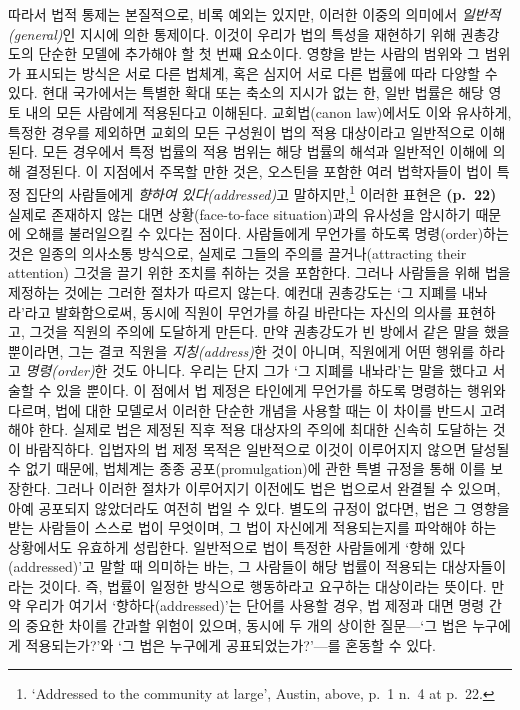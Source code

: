 \documentclass[12pt, oneside]{book}  %
\begin{document}
따라서 법적 통제는 본질적으로, 비록 예외는 있지만, 이러한 이중의
의미에서 \emph{일반적(general)}인 지시에 의한 통제이다. 이것이 우리가
법의 특성을 재현하기 위해 권총강도의 단순한 모델에 추가해야 할 첫 번째
요소이다. 영향을 받는 사람의 범위와 그 범위가 표시되는 방식은 서로 다른
법체계, 혹은 심지어 서로 다른 법률에 따라 다양할 수 있다. 현대
국가에서는 특별한 확대 또는 축소의 지시가 없는 한, 일반 법률은 해당 영토
내의 모든 사람에게 적용된다고 이해된다. 교회법(canon law)에서도 이와
유사하게, 특정한 경우를 제외하면 교회의 모든 구성원이 법의 적용
대상이라고 일반적으로 이해된다. 모든 경우에서 특정 법률의 적용 범위는
해당 법률의 해석과 일반적인 이해에 의해 결정된다. 이 지점에서 주목할
만한 것은, 오스틴을 포함한 여러 법학자들이 법이 특정 집단의 사람들에게
\emph{향하여 있다(addressed)}고 말하지만,\footnote{`Addressed to the
  community at large', Austin, above, p.~1 n.~4 at p.~22.} 이러한 표현은
\textbf{(p.~22)} 실제로 존재하지 않는 대면 상황(face-to-face
situation)과의 유사성을 암시하기 때문에 오해를 불러일으킬 수 있다는
점이다. 사람들에게 무언가를 하도록 명령(order)하는 것은 일종의 의사소통
방식으로, 실제로 그들의 주의를 끌거나(attracting their attention) 그것을
끌기 위한 조치를 취하는 것을 포함한다. 그러나 사람들을 위해 법을
제정하는 것에는 그러한 절차가 따르지 않는다. 예컨대 권총강도는 `그 지폐를
내놔라'라고 발화함으로써, 동시에 직원이 무언가를 하길 바란다는 자신의
의사를 표현하고, 그것을 직원의 주의에 도달하게 만든다. 만약 권총강도가 빈
방에서 같은 말을 했을 뿐이라면, 그는 결코 직원을 \emph{지칭(address)}한
것이 아니며, 직원에게 어떤 행위를 하라고 \emph{명령(order)}한 것도
아니다. 우리는 단지 그가 `그 지폐를 내놔라'는 말을 했다고 서술할 수 있을
뿐이다. 이 점에서 법 제정은 타인에게 무언가를 하도록 명령하는 행위와
다르며, 법에 대한 모델로서 이러한 단순한 개념을 사용할 때는 이 차이를
반드시 고려해야 한다. 실제로 법은 제정된 직후 적용 대상자의 주의에
최대한 신속히 도달하는 것이 바람직하다. 입법자의 법 제정 목적은
일반적으로 이것이 이루어지지 않으면 달성될 수 없기 때문에, 법체계는 종종
공포(promulgation)에 관한 특별 규정을 통해 이를 보장한다. 그러나 이러한
절차가 이루어지기 이전에도 법은 법으로서 완결될 수 있으며, 아예 공포되지
않았더라도 여전히 법일 수 있다. 별도의 규정이 없다면, 법은 그 영향을
받는 사람들이 스스로 법이 무엇이며, 그 법이 자신에게 적용되는지를
파악해야 하는 상황에서도 유효하게 성립한다. 일반적으로 법이 특정한
사람들에게 `향해 있다(addressed)'고 말할 때 의미하는 바는, 그 사람들이
해당 법률이 적용되는 대상자들이라는 것이다. 즉, 법률이 일정한 방식으로
행동하라고 요구하는 대상이라는 뜻이다. 만약 우리가 여기서
`향하다(addressed)'는 단어를 사용할 경우, 법 제정과 대면 명령 간의
중요한 차이를 간과할 위험이 있으며, 동시에 두 개의 상이한 질문---`그
법은 누구에게 적용되는가?'와 `그 법은 누구에게 공표되었는가?'---를
혼동할 수 있다.
\end{document}
